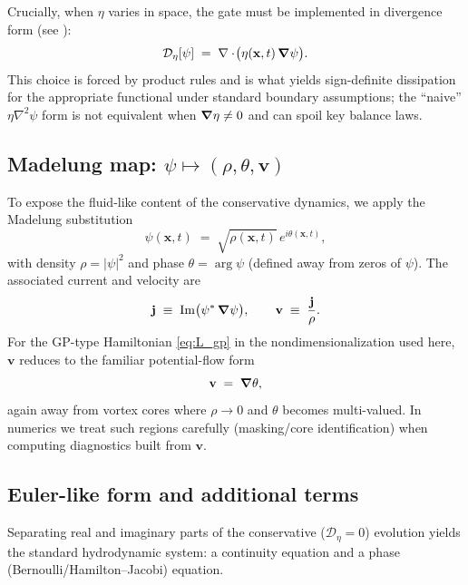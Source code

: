 \documentclass[11pt]{article}
\theoremstyle{plain}
\theoremstyle{definition}
\theoremstyle{remark}
\newcommand{\diver}{\nabla\cdot}
\newcommand{\vfield}{\mathbf{v}}
\begin{document}
Crucially, when $\eta$ varies in space, the gate must be implemented in divergence form (see ):
\begin{equation}\label{eq:scalar_gate_div_form}
  \mathcal{D}_{\eta}[\psi]
  \;=\;
  \diver\!\big(\eta(\mathbf{x},t)\,\grad \psi\big).
\end{equation}
This choice is forced by product rules and is what yields sign-definite dissipation for the appropriate functional under standard boundary assumptions; the ``naive'' $\eta\nabla^2\psi$ form is not equivalent when $\grad \eta\neq 0$ and can spoil key balance laws.

\subsection{Madelung map: $\psi \mapsto (\rho,\theta,\vfield)$}\label{sec:toy_model_madelung}
To expose the fluid-like content of the conservative dynamics, we apply the Madelung substitution
\begin{equation}\label{eq:madelung}
  \psi(\mathbf{x},t) \;=\; \sqrt{\rho(\mathbf{x},t)}\,e^{i\theta(\mathbf{x},t)},
\end{equation}
with density $\rho = |\psi|^2$ and phase $\theta=\arg\psi$ (defined away from zeros of $\psi$). The associated current and velocity are
\begin{equation}\label{eq:current_velocity}
  \mathbf{j} \;\equiv\; \Im\!\big(\psi^*\,\grad\psi\big),
  \qquad
  \vfield \;\equiv\; \frac{\mathbf{j}}{\rho}.
\end{equation}
For the GP-type Hamiltonian \eqref{eq:L_gp} in the nondimensionalization used here, $\vfield$ reduces to the familiar potential-flow form
\begin{equation}\label{eq:v_phase}
  \vfield \;=\; \grad\theta,
\end{equation}
again away from vortex cores where $\rho\to 0$ and $\theta$ becomes multi-valued. In numerics we treat such regions carefully (masking/core identification) when computing diagnostics built from $\vfield$.

\subsection{Euler-like form and additional terms}\label{sec:toy_model_euler}
Separating real and imaginary parts of the conservative ($\mathcal{D}_\eta=0$) evolution yields the standard hydrodynamic system: a continuity equation and a phase (Bernoulli/Hamilton--Jacobi) equation.
\end{document}
